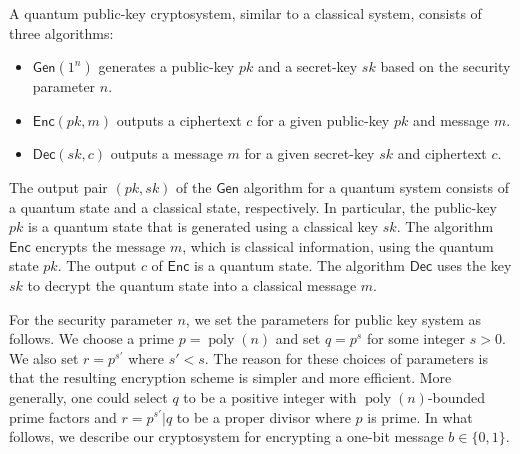 \documentclass[11pt]{article}
\theoremstyle{plain}
\theoremstyle{definition}
\DeclareMathOperator{\poly}{poly}
\def\gen{\mathsf{Gen}}
\def\enc{\mathsf{Enc}}
\def\dec{\mathsf{Dec}}
\begin{document}
A quantum public-key cryptosystem, similar to a classical system, consists of three algorithms:
\begin{itemize}[itemsep = 1pt]
\item $\gen(1^n)$ generates a public-key $pk$ and a secret-key $sk$ based on the security parameter $n$.
\item $\enc(pk, m)$ outputs a ciphertext $c$ for a given public-key $pk$ and message $m$.
\item $\dec(sk, c)$ outputs a message $m$ for a given secret-key $sk$ and ciphertext $c$.
\end{itemize}
The output pair $(pk, sk)$ of the $\gen$ algorithm for a quantum system consists  of a quantum state and a classical state, respectively. In particular, the public-key $pk$ is a quantum state that is generated using a classical key $sk$. The algorithm $\enc$ encrypts the message $m$, which is classical information, using the quantum state $pk$. The output $c$ of $\enc$ is a quantum state. The algorithm $\dec$ uses the key $sk$ to decrypt the quantum state into a classical message $m$.

For the security parameter $n$, we set the parameters for public key system as follows. We choose a prime $p = \poly(n)$ and set $q = p^s$ for some integer $s > 0$. We also set $r = p^{s'}$ where $s' < s$. The reason for these choices of parameters is that the resulting encryption scheme is simpler and more efficient. More generally, one could select $q$ to be a positive integer with $\poly(n)$-bounded prime factors and $r = p^{s'} \vert q$ to be a proper divisor where $p$ is prime. In what follows, we describe our cryptosystem for encrypting a one-bit message $b \in \{ 0, 1 \}$.
\end{document}
